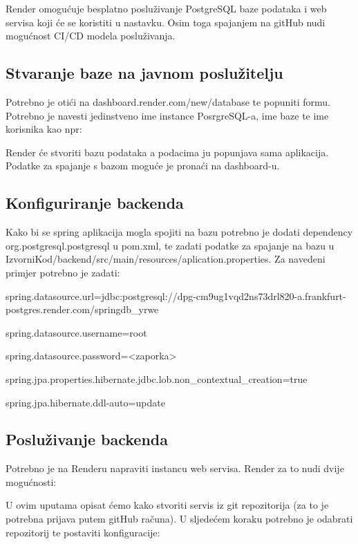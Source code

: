 Render omogućuje besplatno posluživanje PostgreSQL baze podataka i web servisa 
koji će se koristiti u nastavku. Osim toga spajanjem na gitHub nudi mogućnost 
CI/CD modela posluživanja.

\subsection{Stvaranje baze na javnom poslužitelju}

Potrebno je otići na dashboard.render.com/new/database te popuniti formu. 
Potrebno je navesti jedinstveno ime instance PosrgreSQL-a, ime baze te ime 
korisnika kao npr:


Render će stvoriti bazu podataka a podacima ju popunjava sama aplikacija. 
Podatke za spajanje s bazom moguće je pronaći na dashboard-u.


\subsection{Konfiguriranje backenda}

Kako bi se spring aplikacija mogla spojiti na bazu potrebno je dodati 
dependency org.postgresql.postgresql u pom.xml, te zadati podatke za spajanje 
na bazu u IzvorniKod/backend/src/main/resources/aplication.properties. Za 
navedeni primjer potrebno je zadati:

spring.datasource.url=jdbc:postgresql://dpg-cm9ug1vqd2ns73drl820-a.frankfurt-postgres.render.com/springdb_yrwe

spring.datasource.username=root

spring.datasource.password=<zaporka>

spring.jpa.properties.hibernate.jdbc.lob.non_contextual_creation=true

spring.jpa.hibernate.ddl-auto=update

\subsection{Posluživanje backenda}

Potrebno je na Renderu napraviti instancu web servisa. Render za to nudi dvije 
mogućnosti:


U ovim uputama opisat ćemo kako stvoriti servis iz git repozitorija (za to je 
potrebna prijava putem gitHub računa). U sljedećem koraku potrebno je odabrati 
repozitorij te postaviti konfiguracije:

